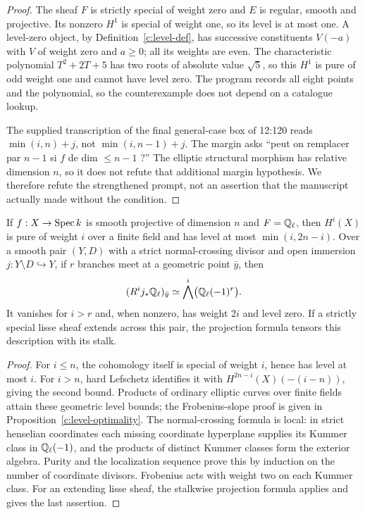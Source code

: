 \begin{proof}
The sheaf $F$ is strictly special of weight zero and $E$ is regular, smooth and projective. Its nonzero $H^1$ is special of weight one, so its level is at most one. A level-zero object, by Definition~\ref{c:level-def}, has successive constituents $V(-a)$ with $V$ of weight zero and $a\geq0$; all its weights are even. The characteristic polynomial $T^2+2T+5$ has two roots of absolute value $\sqrt5$, so this $H^1$ is pure of odd weight one and cannot have level zero. The program records all eight points and the polynomial, so the counterexample does not depend on a catalogue lookup.

The supplied transcription of the final general-case box of 12:120 reads $\min(i,n)+j$, not $\min(i,n-1)+j$. The margin asks ``peut on remplacer par $n-1$ si $f$ de dim $\leq n-1$ ?'' The elliptic structural morphism has relative dimension $n$, so it does not refute that additional margin hypothesis. We therefore refute the strengthened prompt, not an assertion that the manuscript actually made without the condition.
\end{proof}

\begin{proposition}
\label{c:level-special-cases}
If $f:X\to\operatorname{Spec} k$ is smooth projective of dimension $n$ and $F=\mathbb Q_\ell$, then $H^i(X)$ is pure of weight $i$ over a finite field and has level at most $\min(i,2n-i)$. Over a smooth pair $(Y,D)$ with a strict normal-crossing divisor and open immersion $j:Y\setminus D\hookrightarrow Y$, if $r$ branches meet at a geometric point $\bar y$, then
\[
 (R^ij_*\mathbb Q_\ell)_{\bar y}\simeq
 \bigwedge^i\bigl(\mathbb Q_\ell(-1)^r\bigr).
\]
It vanishes for $i>r$ and, when nonzero, has weight $2i$ and level zero. If a strictly special lisse sheaf extends across this pair, the projection formula tensors this description with its stalk.
\end{proposition}

\begin{proof}
For $i\leq n$, the cohomology itself is special of weight $i$, hence has level at most $i$. For $i>n$, hard Lefschetz identifies it with $H^{2n-i}(X)(-(i-n))$, giving the second bound. Products of ordinary elliptic curves over finite fields attain these geometric level bounds; the Frobenius-slope proof is given in Proposition~\ref{c:level-optimality}. The normal-crossing formula is local: in strict henselian coordinates each missing coordinate hyperplane supplies its Kummer class in $\mathbb Q_\ell(-1)$, and the products of distinct Kummer classes form the exterior algebra. Purity and the localization sequence prove this by induction on the number of coordinate divisors. Frobenius acts with weight two on each Kummer class. For an extending lisse sheaf, the stalkwise projection formula applies and gives the last assertion.
\end{proof}

